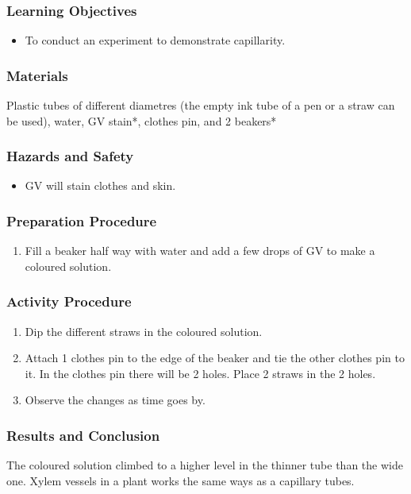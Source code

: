 \subsubsection*{Learning Objectives}
\begin{itemize}
\item{To conduct an experiment to demonstrate capillarity.}
\end{itemize}

\subsubsection*{Materials}
Plastic tubes of different diametres (the empty ink tube of a pen or a straw can be used), water, GV stain*, clothes pin, and 2 beakers*

\subsubsection*{Hazards and Safety}
\begin{itemize}
\item{GV will stain clothes and skin.}
\end{itemize}

\subsubsection*{Preparation Procedure}
\begin{enumerate}
\item{Fill a beaker half way with water and add a few drops of GV to make a coloured solution.}
\end{enumerate}

\subsubsection*{Activity Procedure}
\begin{enumerate}
\item{Dip the different straws in the coloured solution.}
\item{Attach 1 clothes pin to the edge of the beaker and tie the other clothes pin to it. In the clothes pin there will be 2 holes. Place 2 straws in the 2 holes.}
\item{Observe the changes as time goes by.}
\end{enumerate}

\subsubsection*{Results and Conclusion}
The coloured solution climbed to a higher level in the thinner tube than the wide one. Xylem vessels in a plant works the same ways as a capillary tubes.

